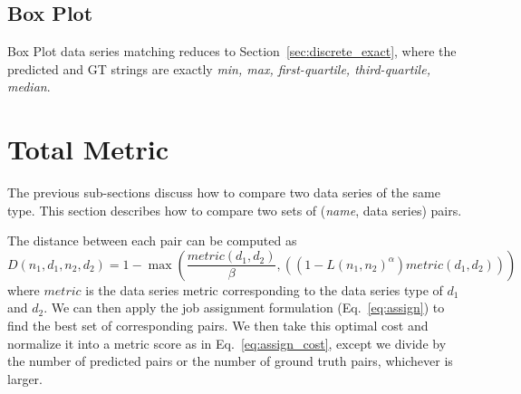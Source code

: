 \documentclass[a4paper,11pt]{scrartcl}
\begin{document}
\subsection{Box Plot}

Box Plot data series matching reduces to Section~\ref{sec:discrete_exact}, where the predicted and GT strings are exactly \emph{min, max, first-quartile, third-quartile, median}.

\section{Total Metric}

The previous sub-sections discuss how to compare two data series of the same type.
This section describes how to compare two sets of (\emph{name}, data series) pairs.

The distance between each pair can be computed as
\begin{equation}
D(n_1, d_1, n_2, d_2) = 1 - \max(\frac{metric(d_1, d_2)}{\beta}, ((1 - L(n_1, n_2)^\alpha)metric(d_1, d_2)))
\end{equation}
where $metric$ is the data series metric corresponding to the data series type of $d_1$ and $d_2$.
We can then apply the job assignment formulation (Eq.~\ref{eq:assign}) to find the best set of corresponding pairs.
We then take this optimal cost and normalize it into a metric score as in Eq.~\ref{eq:assign_cost}, except we divide by the number of predicted pairs or the number of ground truth pairs, whichever is larger.
\end{document}
